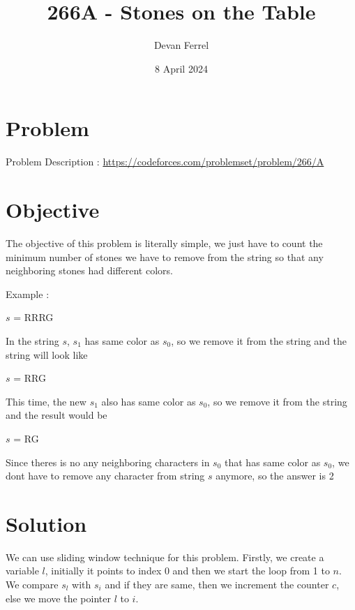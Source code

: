 \documentclass{article}
\title{266A - Stones on the Table}
\author{Devan Ferrel}
\date{8 April 2024}
\begin{document}
\maketitle


\section{Problem}

Problem Description : \href{https://codeforces.com/problemset/problem/266/A}{https://codeforces.com/problemset/problem/266/A}

\section{Objective}

The objective of this problem is literally simple, we just have to count the minimum number of stones we have to remove from the string 
so that any neighboring stones had different colors.

Example : 

$s$ = RRRG

In the string $s$, $s_1$ has same color as $s_0$, so we remove it from the string and the string will look like

$s$ = RRG

This time, the new $s_1$ also has same color as $s_0$, so we remove it from the string and the result would be 

$s$ = RG

Since theres is no any neighboring characters in $s_0$ that has same color as $s_0$, we dont have to remove any character from string $s$ anymore, so the answer is 2

\section{Solution}

We can use sliding window technique for this problem.
Firstly, we create a variable $l$, initially it points to index 0 and then we start the loop from 1 to $n$. We compare $s_l$ with $s_i$ and if they are same, then we increment the counter $c$, else we move the pointer $l$ to $i$. 
\end{document}
